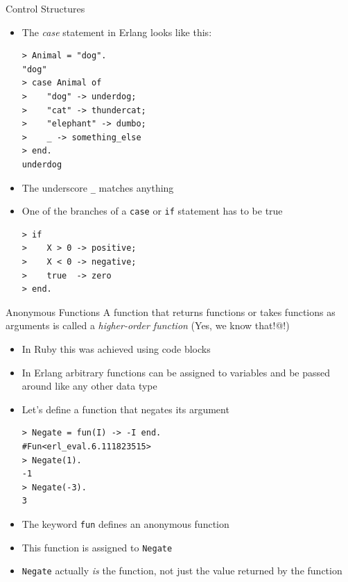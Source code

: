 \documentclass[12pt,xcolor=svgnames]{beamer}
\begin{document}
\begin{frame}{Control Structures}
\begin{itemize}
\item The \emph{case} statement in Erlang looks like this:
\begin{Verbatim}
> Animal = "dog".
"dog"
> case Animal of
>    "dog" -> underdog;
>    "cat" -> thundercat;
>    "elephant" -> dumbo;
>    _ -> something_else
> end.
underdog
\end{Verbatim}
\item The underscore \texttt{\_} matches anything
\end{itemize}

\framebreak

\begin{itemize}
\item One of the branches of a \texttt{case} or \texttt{if} statement has to be true
\begin{Verbatim}
> if   
>    X > 0 -> positive;
>    X < 0 -> negative;
>    true  -> zero
> end.
\end{Verbatim}
\end{itemize}
\end{frame}

\begin{frame}{Anonymous Functions}
A function that returns functions or takes functions as arguments is called a \emph{higher-order function}
(Yes, we know that!@!)
\begin{itemize}
\item In Ruby this was achieved using code blocks
\item In Erlang arbitrary functions can be assigned to variables and be passed around like any other data type
\end{itemize}

\framebreak

\begin{itemize}
\item Let's define a function that negates its argument
\begin{Verbatim}
> Negate = fun(I) -> -I end.
#Fun<erl_eval.6.111823515>
> Negate(1).
-1
> Negate(-3).
3
\end{Verbatim}
\item The keyword \texttt{fun} defines an anonymous function
\item This function is assigned to \texttt{Negate}
\item \texttt{Negate} actually \emph{is} the function, not just the value returned by the function
\end{itemize}
\end{frame}
\end{document}
